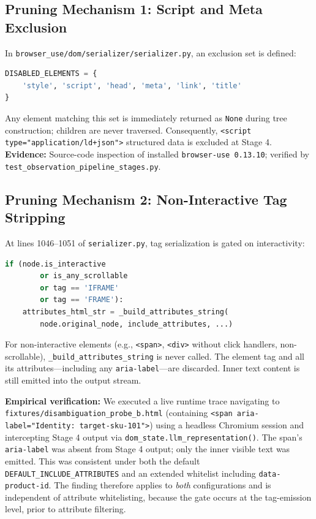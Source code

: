 \documentclass[conference]{IEEEtran}
\begin{document}
\subsection{Pruning Mechanism 1: Script and Meta Exclusion}

In \texttt{browser\_use/dom/serializer/serializer.py}, an exclusion set is defined:
\begin{lstlisting}[language=Python]
DISABLED_ELEMENTS = {
    'style', 'script', 'head', 'meta', 'link', 'title'
}
\end{lstlisting}
Any element matching this set is immediately returned as \texttt{None} during tree construction; children are never traversed. Consequently, \texttt{<script type="application/ld+json">} structured data is excluded at Stage 4. \textbf{Evidence:} Source-code inspection of installed \texttt{browser-use 0.13.10}; verified by \texttt{test\_observation\_pipeline\_stages.py}.

\subsection{Pruning Mechanism 2: Non-Interactive Tag Stripping}

At lines 1046--1051 of \texttt{serializer.py}, tag serialization is gated on interactivity:
\begin{lstlisting}[language=Python]
if (node.is_interactive
        or is_any_scrollable
        or tag == 'IFRAME'
        or tag == 'FRAME'):
    attributes_html_str = _build_attributes_string(
        node.original_node, include_attributes, ...)
\end{lstlisting}
For non-interactive elements (e.g., \texttt{<span>}, \texttt{<div>} without click handlers, non-scrollable), \texttt{\_build\_attributes\_string} is never called. The element tag and all its attributes---including any \texttt{aria-label}---are discarded. Inner text content is still emitted into the output stream.

\textbf{Empirical verification:} We executed a live runtime trace navigating to \texttt{fixtures/disambiguation\_probe\_b.html} (containing \texttt{<span aria-label="Identity: target-sku-101">}) using a headless Chromium session and intercepting Stage 4 output via \texttt{dom\_state.llm\_representation()}. The span's \texttt{aria-label} was absent from Stage 4 output; only the inner visible text was emitted. This was consistent under both the default \texttt{DEFAULT\_INCLUDE\_ATTRIBUTES} and an extended whitelist including \texttt{data-product-id}. The finding therefore applies to \emph{both} configurations and is independent of attribute whitelisting, because the gate occurs at the tag-emission level, prior to attribute filtering.
\end{document}
